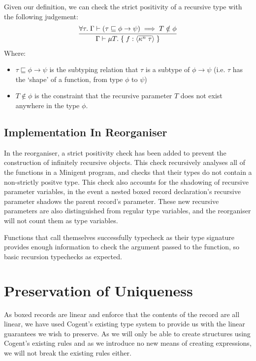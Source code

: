 Given our definition, we can check the strict positivity of a recursive type with the following judgement:
$$
\infer{
    \Gamma \vdash \mu T.\; \{\; f: \langle \overline{\kappa^n\; \tau} \rangle\; \}
}{
   \forall \tau.\; \Gamma \vdash (\tau \sqsubseteq \phi \rightarrow \psi) \implies T \notin \phi
}
$$
Where:
\begin{itemize}
    \item 
        $\tau \sqsubseteq \phi \rightarrow \psi$ is the subtyping relation that $\tau$ 
        is a subtype of $\phi \rightarrow \psi$ 
        (i.e. $\tau$ has the `shape' of a function, from type $\phi$ to $\psi$) 
    \item
        $T \notin \phi$ is the constraint that the recursive parameter $T$ 
        does not exist anywhere in the type $\phi$.
\end{itemize}


\subsection{Implementation In Reorganiser}

In the reorganiser, a strict positivity check has been added to prevent the construction of infinitely
recursive objects. This check recursively analyses all of the functions in a Minigent program, and
checks that their types do not contain a non-strictly positve type. This check also accounts for the
shadowing of recursive parameter variables, in the event a nested boxed record declaration's recursive
parameter shadows the parent record's parameter. These new recursive parameters are also distinguished from
regular type variables, and the reorganiser will not count them as type variables.

Functions that call themselves successfully typecheck as their type signature provides enough information
to check the argument passed to the function, so basic recursion typechecks as expected.

\section{Preservation of Uniqueness}

As boxed records are linear and enforce that the contents of the record are all linear, we
have used Cogent's existing type system to provide us with the linear guarantees we wish to preserve.
As we will only be able to create structures using Cogent's existing rules and as we introduce
no new means of creating expressions, we will not break the existing rules either. 


